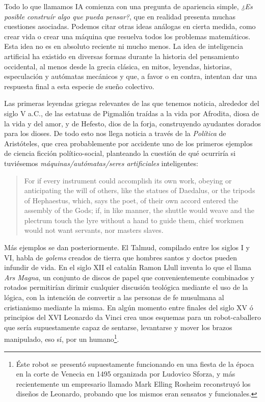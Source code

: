 \documentclass[12pt]{memoir}
\begin{document}
Todo lo que llamamos IA comienza con una pregunta de apariencia simple, \textit{¿Es posible construír algo que pueda pensar?}, que en realidad presenta muchas cuestiones asociadas. Podemos citar otras ideas análogas en cierta medida, como crear vida o crear una máquina que resuelva todos los problemas matemáticos. Esta idea no es en absoluto reciente ni mucho menos. La idea de inteligencia artificial ha existido en diversas formas durante la historia del pensamiento occidental, al menos desde la grecia clásica, en mitos, leyendas, historias, especulación y autómatas mecánicos y que, a favor o en contra, intentan dar una respuesta final a esta especie de sueño colectivo.

Las primeras leyendas griegas relevantes de las que tenemos noticia, alrededor del siglo V a.C., de las estatuas de Pigmalión traídas a la vida por Afrodita, diosa de la vida y del amor, y de Hefesto, dios de la forja, construyendo ayudantes dorados para los dioses. De todo esto nos llega noticia a través de la \textit{Política} de Aristóteles, que crea probablemente por accidente uno de los primeros ejemplos de ciencia ficción político-social, planteando la cuestión de qué ocurriría si tuviésemos \textit{máquinas/autómatas/seres artificiales} inteligentes:

\blockquote{For if every instrument could accomplish its own work, obeying or anticipating the will of others, like the statues of Daedalus, or the tripods of Hephaestus, which, says the poet, of their own accord entered the assembly of the Gods; if, in like manner, the shuttle would weave and the plectrum touch the lyre without a hand to guide them, chief workmen would not want servants, nor masters slaves. \parencite{aristotlePolitics}}

Más ejemplos se dan posteriormente. El Talmud, compilado entre los siglos I y VI, habla de \textit{golems} creados de tierra que hombres santos y doctos pueden infundir de vida. En el siglo XII el catalán Ramon Llull inventa lo que el llama \textit{Ars Magna}, un conjunto de discos de papel que convenientemente combinados y rotados permitirían dirimir cualquier discusión teológica mediante el uso de la lógica, con la intención de convertir a las personas de fe musulmana al cristianismo mediante la misma. En algún momento entre finales del siglo XV ó principios del XVI Leonardo da Vinci crea unos esquemas para un robot-caballero que sería supuestamente capaz de sentarse, levantarse y mover los brazos manipulado, eso sí, por un humano\footnote{Éste robot se presentó supuestamente funcionando en una fiesta de la época en la corte de Venecia en 1495 organizada por Ludovico Sforza, y más recientemente un empresario llamado Mark Elling Rosheim reconstruyó los diseños de Leonardo, probando que los mismos eran sensatos y funcionales.}. 
\end{document}
